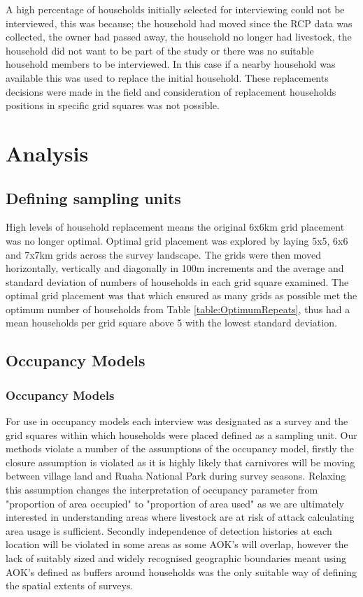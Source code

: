 A high percentage of households initially selected for interviewing could not be interviewed, this was because; the household had moved since the RCP data was collected, the owner had passed away, the household no longer had livestock, the household did not want to be part of the study or there was no suitable household members to be interviewed. In this case if a nearby household was available this was used to replace the initial household. These replacements decisions were made in the field and consideration of replacement households positions in specific grid squares was not possible.

\section{Analysis}

\subsection{Defining sampling units}
High levels of household replacement means the original 6x6km grid placement was no longer optimal. Optimal grid placement was explored by laying 5x5, 6x6 and 7x7km grids across the survey landscape. The grids were then moved horizontally, vertically and diagonally in 100m increments and the average and standard deviation of numbers of households in each grid square examined. The optimal grid placement was that which ensured as many grids as possible met the optimum number of households from Table \ref{table:OptimumRepeats}, thus had a mean households per grid square above 5 with the lowest standard deviation. 

\subsection{Occupancy Models}

\subsubsection{Occupancy Models}
For use in occupancy models each interview was designated as a survey and the grid squares within which households were placed defined as a sampling unit. Our methods violate a number of the assumptions of the occupancy model, firstly the closure assumption is violated as it is highly likely that carnivores will be moving between village land and Ruaha National Park during survey seasons. Relaxing this assumption changes the interpretation of occupancy parameter from "proportion of area occupied" to "proportion of area used" \cite{Mackenzie2004} as we are ultimately interested in understanding areas where livestock are at risk of attack calculating area usage is sufficient. Secondly independence of detection histories at each location will be violated in some areas as some AOK's will overlap, however the lack of suitably sized and widely recognised geographic boundaries meant using AOK's defined as buffers around households was the only suitable way of defining the spatial extents of surveys.\\

